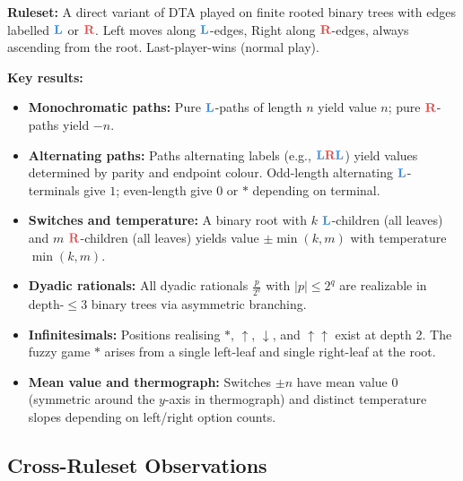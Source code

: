 \documentclass[10pt,a4paper,twocolumn]{article}
\newcommand{\Lopt}[1]{{\color{lblue}\textbf{#1}}}
\newcommand{\Ropt}[1]{{\color{rred}\textbf{#1}}}
\theoremstyle{plain}
\theoremstyle{definition}
\theoremstyle{remark}
\begin{document}
\textbf{Ruleset:} A direct variant of DTA played on finite rooted binary trees with edges labelled $\Lopt{L}$ or $\Ropt{R}$. Left moves along $\Lopt{L}$-edges, Right along $\Ropt{R}$-edges, always ascending from the root. Last-player-wins (normal play).

\textbf{Key results:}
\begin{itemize}
\item \textbf{Monochromatic paths:} Pure $\Lopt{L}$-paths of length $n$ yield value $n$; pure $\Ropt{R}$-paths yield $-n$.
\item \textbf{Alternating paths:} Paths alternating labels (e.g., $\Lopt{L}\Ropt{R}\Lopt{L}$) yield values determined by parity and endpoint colour. Odd-length alternating $\Lopt{L}$-terminals give $1$; even-length give $0$ or $*$ depending on terminal.
\item \textbf{Switches and temperature:} A binary root with $k$ $\Lopt{L}$-children (all leaves) and $m$ $\Ropt{R}$-children (all leaves) yields value $\pm\min(k,m)$ with temperature $\min(k,m)$.
\item \textbf{Dyadic rationals:} All dyadic rationals $\frac{p}{2^q}$ with $|p| \le 2^q$ are realizable in depth-$\le 3$ binary trees via asymmetric branching.
\item \textbf{Infinitesimals:} Positions realising $*$, $\uparrow$, $\downarrow$, and $\uparrow\uparrow$ exist at depth 2. The fuzzy game $*$ arises from a single left-leaf and single right-leaf at the root.
\item \textbf{Mean value and thermograph:} Switches $\pm n$ have mean value $0$ (symmetric around the $y$-axis in thermograph) and distinct temperature slopes depending on left/right option counts.
\end{itemize}

\vspace{14pt}

\subsection{Cross-Ruleset Observations}
\end{document}
